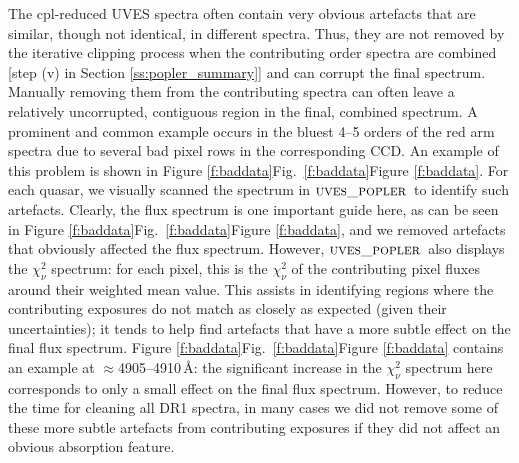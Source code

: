 \documentclass[fleqn,usenatbib,usedcolumn]{mnras}
\newcommand{\Sref}[1]{Section \ref{#1}}
\newcommand{\Fref}[1]{\ifhmode \ifnum\spacefactor=1001 Figure \ref{#1}\else Fig.\ \ref{#1}\fi \else Figure \ref{#1}\fi}
\newcommand{\popler}{\ensuremath{\textsc{uves\_popler}}}
\begin{document}
The {\sc cpl}-reduced UVES spectra often contain very obvious artefacts that are similar, though not identical, in different spectra. Thus, they are not removed by the iterative clipping process when the contributing order spectra are combined [step (v) in \Sref{ss:popler_summary}] and can corrupt the final spectrum. Manually removing them from the contributing spectra can often leave a relatively uncorrupted, contiguous region in the final, combined spectrum. A prominent and common example occurs in the bluest 4--5 orders of the red arm spectra due to several bad pixel rows in the corresponding CCD. An example of this problem is shown in \Fref{f:baddata}. For each quasar, we visually scanned the spectrum in \popler\ to identify such artefacts. Clearly, the flux spectrum is one important guide here, as can be seen in \Fref{f:baddata}, and we removed artefacts that obviously affected the flux spectrum. However, \popler\ also displays the $\chi_\nu^2$ spectrum: for each pixel, this is the $\chi_\nu^2$ of the contributing pixel fluxes around their weighted mean value. This assists in identifying regions where the contributing exposures do not match as closely as expected (given their uncertainties); it tends to help find artefacts that have a more subtle effect on the final flux spectrum. \Fref{f:baddata} contains an example at $\approx$4905--4910\,\AA: the significant increase in the $\chi_\nu^2$ spectrum here corresponds to only a small effect on the final flux spectrum. However, to reduce the time for cleaning all DR1 spectra, in many cases we did not remove some of these more subtle artefacts from contributing exposures if they did not affect an obvious absorption feature.
\end{document}
